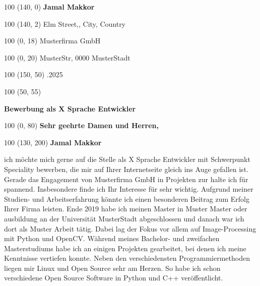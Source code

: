\documentclass{article}%
\begin{document}
%
\normalsize%
\begin{minipage}{\textwidth}%
\begin{textblock}{100}%
(140, 0)%
\noindent%
\textbf{Jamal Makkor}%
\end{textblock}%
\begin{textblock}{100}%
(140, 2)%
\noindent%
Elm Street,, City, \newline%
Country%
\end{textblock}%
\begin{textblock}{100}%
(0, 18)%
\noindent%
Musterfirma GmbH%
\end{textblock}%
\begin{textblock}{100}%
(0, 20)%
\noindent%
\newline%
MusterStr, 0000\newline%
MusterStadt\newline%
%
\end{textblock}%
\begin{textblock}{100}%
(150, 50)%
.2025%
\end{textblock}%
\begin{textblock}{100}%
(50, 55)%
\noindent%
\begin{large}%
\textbf{Bewerbung als                         X Sprache Entwickler}%
\end{large}%
\end{textblock}%
\begin{textblock}{100}%
(0, 80)%
\noindent%
\textbf{Sehr geehrte Damen und Herren,}%
\end{textblock}%
\begin{textblock}{100}%
(130, 200)%
\noindent%
\textbf{Jamal Makkor}%
\end{textblock}%
\vspace*{90mm}%
\onehalfspacing%
ich möchte mich gerne auf die Stelle als X Sprache Entwickler mit Schwerpunkt Speciality bewerben, die mir auf Ihrer Internetseite gleich ins Auge gefallen ist. Gerade das Engagement von Musterfirma GmbH in Projekten zur  halte ich für spannend. Insbesondere finde ich Ihr Interesse für  sehr wichtig. Aufgrund meiner Studien{-} und Arbeitserfahrung könnte ich einen besonderen Beitrag zum Erfolg Ihrer Firma leisten.\newline%
\newline%
Ende 2019 habe ich meinen Master in Muster Master oder ausbildung an der Universität MusterStadt abgeschlossen und danach war ich dort als Muster Arbeit tätig. Dabei lag der Fokus vor allem auf Image{-}Processing mit Python und OpenCV. Während meines Bachelor{-} und zweifachen Masterstudiums habe ich an einigen Projekten gearbeitet, bei denen ich meine Kenntnisse vertiefen konnte. Neben den verschiedensten Programmiermethoden liegen mir Linux und Open Source sehr am Herzen. So habe ich schon verschiedene Open Source Software in Python und C++ veröffentlicht.\newline%

\end{minipage}
\end{document}
